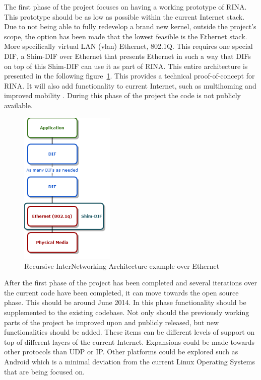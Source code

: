 \npar

The first phase of the project focuses on having a working prototype of RINA. This prototype should be as low as possible within the current Internet stack. Due to not being able to fully redevelop a brand new kernel, outside the project's scope, the option has been made that the lowest feasible is the Ethernet stack. More specifically virtual LAN (vlan) Ethernet, 802.1Q. This requires one special DIF, a Shim-DIF over Ethernet that presents Ethernet in such a way that DIFs on top of this Shim-DIF can use it as part of RINA. This entire architecture is presented in the following figure~\ref{fig:rinaoverethernet}. This provides a technical proof-of-concept for RINA. It will also add functionality to current Internet, such as multihoming and improved mobility \citep{vrijders2014prototyping}. During this phase of the project the code is not publicly available.

\npar
\begin{figure}[H]
    \centering
    \includegraphics[width=0.4\textwidth]{figures/rinaoverethernet}
    \caption{Recursive InterNetworking Architecture example over Ethernet} 
    \label{fig:rinaoverethernet}
\end{figure}

\npar

After the first phase of the project has been completed and several iterations over the current code have been completed, it can move towards the open source phase. This should be around June 2014. In this phase functionality should be supplemented to the existing codebase. Not only should the previously working parts of the project be improved upon and publicly released, but new functionalities should be added. These items can be different levels of support on top of different layers of the current Internet. Expansions could be made towards other protocols than UDP or IP. Other platforms could be explored such as Android which is a minimal deviation from the current Linux Operating Systems that are being focused on. 

